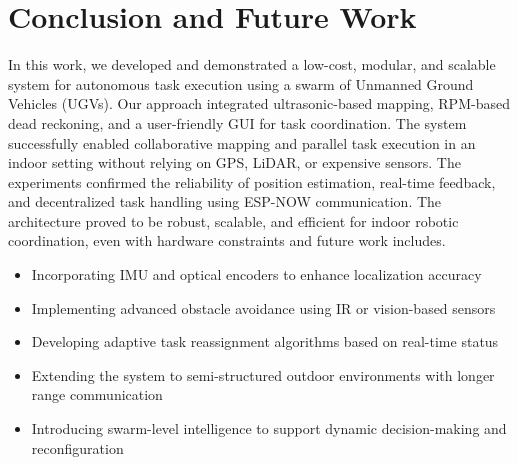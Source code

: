 \documentclass[conference]{IEEEtran}
\begin{document}
\section{Conclusion and Future Work}
\label{sec:conclusion}
In this work, we developed and demonstrated a low-cost, modular, and scalable system for autonomous task execution using a swarm of Unmanned Ground Vehicles (UGVs). Our approach integrated ultrasonic-based mapping, RPM-based dead reckoning, and a user-friendly GUI for task coordination. The system successfully enabled collaborative mapping and parallel task execution in an indoor setting without relying on GPS, LiDAR, or expensive sensors.
The experiments confirmed the reliability of position estimation, real-time feedback, and decentralized task handling using ESP-NOW communication. The architecture proved to be robust, scalable, and efficient for indoor robotic coordination, even with hardware constraints and future work includes.

\begin{itemize}
\item Incorporating IMU and optical encoders to enhance localization accuracy
\item Implementing advanced obstacle avoidance using IR or vision-based sensors
\item Developing adaptive task reassignment algorithms based on real-time status
\item Extending the system to semi-structured outdoor environments with longer range communication
\item Introducing swarm-level intelligence to support dynamic decision-making and reconfiguration
\end{itemize}



\end{document}
